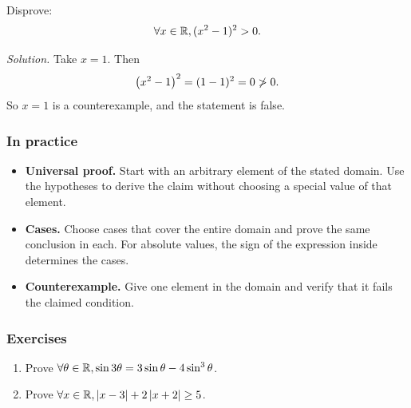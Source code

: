 \begin{example}
    Disprove:
    \begin{equation*}
        \forall x \in \mathbb{R}, (x^2 - 1)^2 > 0.
    \end{equation*}
\end{example}
\noindent\emph{Solution.} Take $x = 1$. Then
\begin{equation*}
    \left(x^2 - 1\right)^2 = (1 - 1)^2 = 0 \not> 0.
\end{equation*}
So $x = 1$ is a counterexample, and the statement is false.

\subsubsection*{In practice}
\begin{itemize}
    \item \textbf{Universal proof.} Start with an arbitrary element of the
    stated domain. Use the hypotheses to derive the claim without choosing
    a special value of that element.
    \item \textbf{Cases.} Choose cases that cover the entire domain and
    prove the same conclusion in each. For absolute values, the sign of the
    expression inside determines the cases.
    \item \textbf{Counterexample.} Give one element in the domain and
    verify that it fails the claimed condition.
\end{itemize}

\subsubsection*{Exercises}
\begin{enumerate}
    \item Prove $\forall \theta \in \mathbb{R}, \sin 3\theta = 3\sin \theta - 4\sin^3 \theta$.
    \item Prove $\forall x \in \mathbb{R}, \left|x - 3 \right| + 2\left|x + 2\right| \geq 5$.
\end{enumerate}
